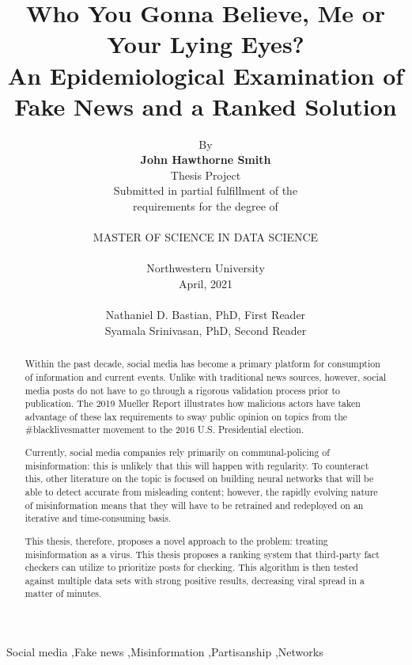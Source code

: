 \documentclass[preprint,review,12pt]{elsarticle}
\begin{document}
\begin{frontmatter}


\title{Who You Gonna Believe, Me or Your Lying Eyes?\\
An Epidemiological Examination of Fake News and a Ranked Solution}

\author{By \\\textbf{John Hawthorne Smith} \\Thesis Project \\Submitted in partial fulfillment of the \\requirements for the degree of \\ \\MASTER OF SCIENCE IN DATA SCIENCE \\ \\Northwestern University \\April, 2021 \\ \\Nathaniel D. Bastian, PhD, First Reader \\Syamala Srinivasan, PhD, Second Reader}




\begin{abstract}
Within the past decade, social media has become a primary platform for consumption of information and current events. Unlike with traditional news sources, however, social media posts do not have to go through a rigorous validation process prior to publication. The 2019 Mueller Report illustrates how malicious actors have taken advantage of these lax requirements to sway public opinion on topics from the \#blacklivesmatter movement to the 2016 U.S. Presidential election. 

Currently, social media companies rely primarily on communal-policing of misinformation: this is unlikely that this will happen with regularity. To counteract this, other literature on the topic is focused on building neural networks that will be able to detect accurate from misleading content; however, the rapidly evolving nature of misinformation means that they will have to be retrained and redeployed on an iterative and time-consuming basis.

This thesis, therefore, proposes a novel approach to the problem: treating misinformation as a virus. This thesis proposes a ranking system that third-party fact checkers can utilize to prioritize posts for checking. This algorithm is then tested against multiple data sets with strong positive results, decreasing viral spread in a matter of minutes.

\end{abstract}

\begin{keyword}
Social media \sep Fake news \sep Misinformation \sep Partisanship \sep Networks
\end{keyword}

\end{frontmatter}
\end{document}
